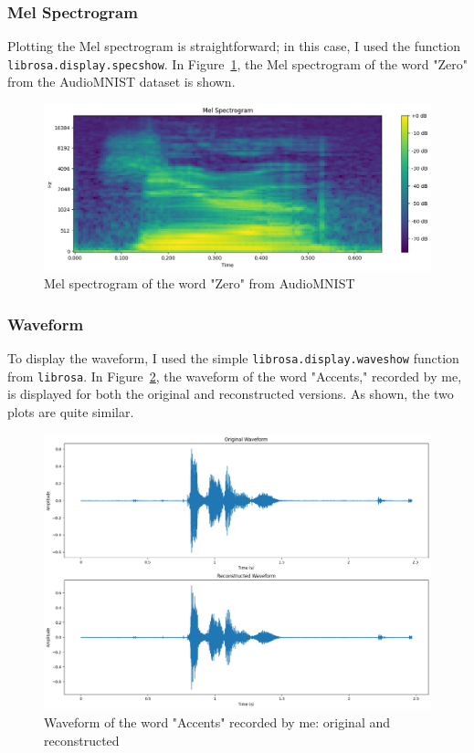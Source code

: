 \documentclass[12pt]{article}
\begin{document}
\subsubsection{Mel Spectrogram}
Plotting the Mel spectrogram is straightforward; in this case, I used the function \\ \texttt{librosa.display.specshow}. In Figure~\ref{fig:melspec_zero}, the Mel spectrogram of the word "Zero" from the AudioMNIST dataset is shown.

\begin{figure}[h]
    \centering
    \includegraphics[width=\linewidth]{melspec_zero.png}
    \caption{Mel spectrogram of the word "Zero" from AudioMNIST}
    \label{fig:melspec_zero}
\end{figure}

\subsubsection{Waveform}
To display the waveform, I used the simple \texttt{librosa.display.waveshow} function from \texttt{librosa}. In Figure~\ref{fig:wav_accents_recorded}, the waveform of the word "Accents," recorded by me, is displayed for both the original and reconstructed versions. As shown, the two plots are quite similar.

\begin{figure}[h]
    \centering
    \includegraphics[width=\linewidth]{waveform_accents_recorded.png}
    \caption{Waveform of the word "Accents" recorded by me: original and reconstructed}
    \label{fig:wav_accents_recorded}
\end{figure}
\end{document}
